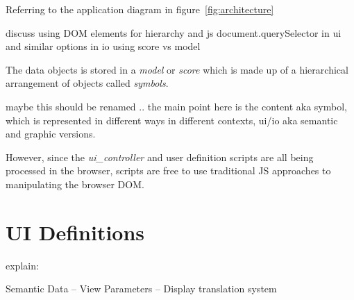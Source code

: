 \documentclass{article}
\def\uicontroller{\textit{ui\_controller}\xspace}
\begin{document}
Referring to the application diagram in figure~\ref{fig:architecture}

discuss using DOM elements for hierarchy and js document.querySelector in ui
and similar options in io using score vs model


The data objects is stored in a \textit{model} or \textit{score} which is made up of a hierarchical arrangement of objects called \textit{symbols}.


maybe this should be renamed ..
the main point here is the content aka symbol, which is represented in different ways in different contexts, ui/io aka semantic and graphic versions.

However, since the \uicontroller and user definition scripts are all being processed in the browser, scripts are free to use traditional JS approaches to manipulating the browser DOM.

\section{UI Definitions}\label{sec:ui_callbacks}

explain:

Semantic Data  -- View Parameters -- Display
translation system
\end{document}
